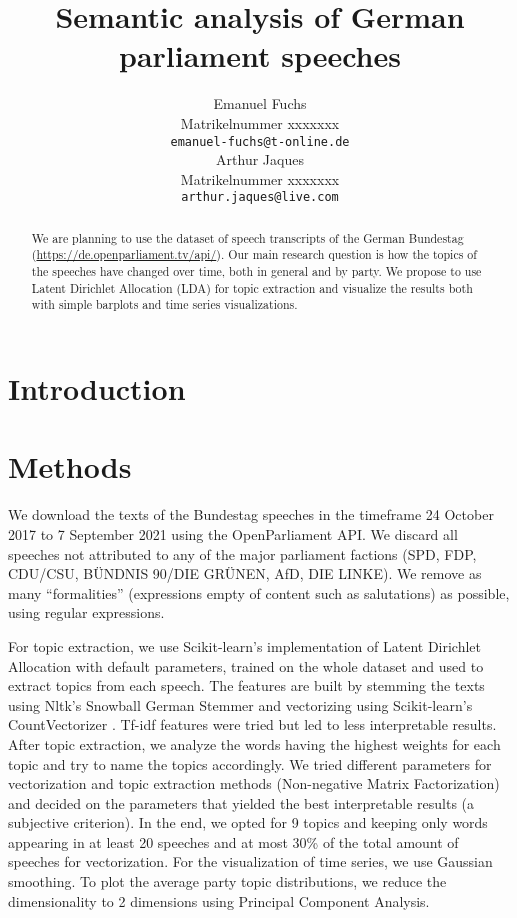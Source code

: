 \documentclass{article}
\title{Semantic analysis of German parliament speeches}
\author{%
  Emanuel Fuchs\\
  Matrikelnummer xxxxxxx\\
  \texttt{emanuel-fuchs@t-online.de} \\
  \And
  Arthur Jaques\\
  Matrikelnummer xxxxxxx\\
  \texttt{arthur.jaques@live.com} \\
}
\begin{document}
\maketitle

\begin{abstract}
  We are planning to use the dataset of speech transcripts of the German Bundestag (\url{https://de.openparliament.tv/api/}).
  Our main research question is how the topics of the speeches have changed over time, both in general and by party.
  We propose to use Latent Dirichlet Allocation (LDA) for topic extraction and visualize the results both with simple barplots and time series visualizations.
\end{abstract}

\section{Introduction}

\section{Methods}
We download the texts of the Bundestag speeches in the timeframe 24 October 2017 to 7 September 2021 using the OpenParliament \cite{OpenParliamentTV} API.
We discard all speeches not attributed to any of the major parliament factions (SPD, FDP, CDU/CSU, BÜNDNIS 90/DIE GRÜNEN, AfD, DIE LINKE).
We remove as many ``formalities'' (expressions empty of content such as salutations) as possible, using regular expressions.

For topic extraction, we use Scikit-learn's \cite{Scikit-learn} implementation of Latent Dirichlet Allocation with default parameters,  trained on the whole dataset and used to extract topics from each speech.
The features are built by stemming the texts using Nltk's \cite{Nltk} Snowball German Stemmer and vectorizing using Scikit-learn's CountVectorizer \cite{Scikit-learn}.
Tf-idf features were tried but led to less interpretable results.
After topic extraction, we analyze the words having the highest weights for each topic and try to name the topics accordingly.
We tried different parameters for vectorization and topic extraction methods (Non-negative Matrix Factorization) and decided on the parameters that yielded the best interpretable results (a subjective criterion).
In the end, we opted for 9 topics and keeping only words appearing in at least 20 speeches and at most 30\% of the total amount of speeches for vectorization.
For the visualization of time series, we use Gaussian smoothing.
To plot the average party topic distributions, we reduce the dimensionality to 2 dimensions using Principal Component Analysis.
\end{document}
